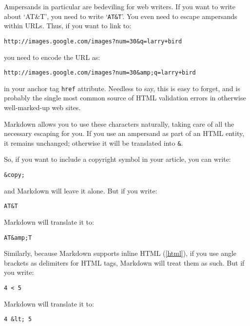 Ampersands in particular are bedeviling for web writers. If you want to
write about `AT\&T', you need to write `\texttt{AT\&T}'. You even need to
escape ampersands within URLs. Thus, if you want to link to:

\begin{verbatim}
http://images.google.com/images?num=30&q=larry+bird
\end{verbatim}

you need to encode the URL as:

\begin{verbatim}
http://images.google.com/images?num=30&amp;q=larry+bird
\end{verbatim}

in your anchor tag \texttt{href} attribute. Needless to say, this is easy to
forget, and is probably the single most common source of HTML validation
errors in otherwise well-marked-up web sites.

Markdown allows you to use these characters naturally, taking care of
all the necessary escaping for you. If you use an ampersand as part of
an HTML entity, it remains unchanged; otherwise it will be translated
into \texttt{\&}.

So, if you want to include a copyright symbol in your article, you can write:

\begin{verbatim}
&copy;
\end{verbatim}

and Markdown will leave it alone. But if you write:

\begin{verbatim}
AT&T
\end{verbatim}

Markdown will translate it to:

\begin{verbatim}
AT&amp;T
\end{verbatim}

Similarly, because Markdown supports inline HTML (\autoref{html}), if you use
angle brackets as delimiters for HTML tags, Markdown will treat them as
such. But if you write:

\begin{verbatim}
4 < 5
\end{verbatim}

Markdown will translate it to:

\begin{verbatim}
4 &lt; 5
\end{verbatim}

